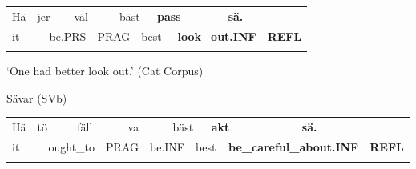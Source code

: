 \begin{tabular}{llllllllllll}
\lsptoprule
Hä & \multicolumn{2}{l}{jer

} & \multicolumn{2}{l}{väl

} & \multicolumn{2}{l}{bäst

} & \multicolumn{2}{l}{{\bfseries pass}

} & \multicolumn{2}{l}{{\bfseries sä.}

} & \\
\multicolumn{2}{l}{it

} & \multicolumn{2}{l}{be.PRS

} & \multicolumn{2}{l}{PRAG

} & \multicolumn{2}{l}{best

} & \multicolumn{2}{l}{{\bfseries look\_out.INF}

} & \multicolumn{2}{l}{{\bfseries REFL}

}\\
\lspbottomrule
\end{tabular}

\begin{styleTranslation}
‘One had better look out.’ (Cat Corpus)

\end{styleTranslation}

\begin{listWWNumileveli}
\item {}

\begin{styleExample}
Sävar (SVb)

\end{styleExample}

\end{listWWNumileveli}

\begin{tabular}{llllllllllllll}
\lsptoprule
Hä & \multicolumn{2}{l}{tö

} & \multicolumn{2}{l}{fäll

} & \multicolumn{2}{l}{va

} & \multicolumn{2}{l}{bäst

} & \multicolumn{2}{l}{{\bfseries akt}

} & \multicolumn{2}{l}{{\bfseries sä.}

} & \\
\multicolumn{2}{l}{it

} & \multicolumn{2}{l}{ought\_to

} & \multicolumn{2}{l}{PRAG

} & \multicolumn{2}{l}{be.INF

} & \multicolumn{2}{l}{best

} & \multicolumn{2}{l}{{\bfseries be\_careful\_about.INF}

} & \multicolumn{2}{l}{{\bfseries REFL}

}\\
\lspbottomrule
\end{tabular}


